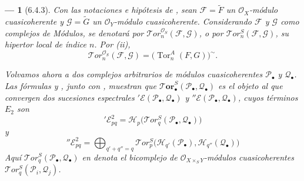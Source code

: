 \documentclass[10pt,oneside,openany]{book}
\theoremstyle{egaenv}\newtheorem*{env}{---}
\theoremstyle{egastatement}
\theoremstyle{egadescription}
\begin{document}
\begin{env}[6.4.3]
\label{III.6.4.3}
Con las notaciones e hipótesis de , sean
$\mathscr F=\widetilde F$ un $\mathscr O_X$-módulo cuasicoherente y
$\mathscr G=\widetilde G$ un $\mathscr O_Y$-módulo cuasicoherente.
Considerando $\mathscr F$ y $\mathscr G$ como complejos de Módulos, se denotará por $\mathscr{T}\!or_n^{\mathscr O_S}(\mathscr F,\mathscr G)$, o
por $\mathscr{T}\!or_n^S(\mathscr F,\mathscr G)$, su hipertor local de índice $n$.
Por (ii),
\[
  \mathscr{T}\!or_n^{\mathscr O_S}(\mathscr F,\mathscr G)
  =\bigl(\operatorname{Tor}_n^A(F,G)\bigr)^{\sim}.
  \tag{6.4.3.1}\label{III.6.4.3.1.fr}
\]

Volvamos ahora a dos complejos arbitrarios de módulos
cuasicoherentes $\mathscr P_\bullet$ y $\mathscr Q_\bullet$. Las fórmulas
 y , junto con
, muestran que
$\boldsymbol{\mathscr{T}\!or}_\bullet^S(\mathscr P_\bullet,\mathscr Q_\bullet)$ es el objeto al
que convergen dos sucesiones espectrales
$'\mathscr E(\mathscr P_\bullet,\mathscr Q_\bullet)$ y
$''\mathscr E(\mathscr P_\bullet,\mathscr Q_\bullet)$, cuyos términos $E_2$ son
\[
  '\mathscr E_{pq}^2
  =\mathscr H_p\bigl(\mathscr{T}\!or_q^S
    (\mathscr P_\bullet,\mathscr Q_\bullet)\bigr)
  \tag{6.4.3.2}\label{III.6.4.3.2.fr}
\]
y
\[
  ''\mathscr E_{pq}^2
  =\bigoplus_{q'+q''=q}
  \mathscr{T}\!or_p^S
  \bigl(\mathscr H_{q'}(\mathscr P_\bullet),
        \mathscr H_{q''}(\mathscr Q_\bullet)\bigr)
  \tag{6.4.3.3}\label{III.6.4.3.3.fr}
\]
Aquí $\mathscr{T}\!or_q^S(\mathscr P_\bullet,\mathscr Q_\bullet)$ en
 denota el bicomplejo de
$\mathscr O_{X\times_S Y}$-módulos cuasicoherentes
$\mathscr{T}\!or_q^S(\mathscr P_i,\mathscr Q_j)$.
\end{env}
\end{document}
